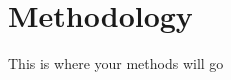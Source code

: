 \documentclass[./dissertation.tex]{subfiles}
\begin{document}
    \section{Methodology}
    This is where your methods will go
\end{document}

